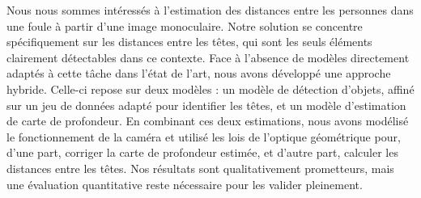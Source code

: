 Nous nous sommes intéressés à l’estimation des distances entre les personnes dans une foule à partir d’une image monoculaire. Notre solution se concentre spécifiquement sur les distances entre les têtes, qui sont les seuls éléments clairement détectables dans ce contexte. Face à l’absence de modèles directement adaptés à cette tâche dans l’état de l’art, nous avons développé une approche hybride. Celle-ci repose sur deux modèles : un modèle de détection d’objets, affiné sur un jeu de données adapté pour identifier les têtes, et un modèle d’estimation de carte de profondeur. En combinant ces deux estimations, nous avons modélisé le fonctionnement de la caméra et utilisé les lois de l’optique géométrique pour, d’une part, corriger la carte de profondeur estimée, et d’autre part, calculer les distances entre les têtes. Nos résultats sont qualitativement prometteurs, mais une évaluation quantitative reste nécessaire pour les valider pleinement.